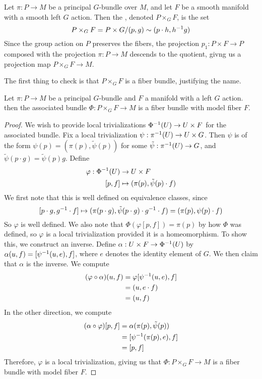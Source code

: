 %
\begin{defn}
Let $\pi : P \to M$ be a principal $G$-bundle over $M$, and let $F$ be a
smooth manifold with a smooth left $G$ action. Then the , denoted $P \times_G F$, is the set
\[
P \times_G F = P \times G / (p,g) \sim (p\cdot h, h^{-1} g)
\]
Since the group action on $P$ preserves the fibers, the projection
$p_1 : P \times F \to P$ composed with the projection $\pi : P \to M$
descends to the quotient, givng us a projection map
$P \times_G F \to M$.
\end{defn}
%
The first thing to check is that $P \times_G F$ is a fiber bundle, justifying
the name.
%
\begin{prop}
Let $\pi : P \to M$ be a principal $G$-bundle and $F$ a manifold with a left $G$ action.
then the associated bundle $ \Phi : P \times_G F \to M$ is a fiber bundle with
model fiber $F$.
\end{prop}
%
\begin{proof}
We wish to provide local trivializations  $\Phi^{-1}(U) \to U \times F$ for the
associated bundle. Fix a local trivialization  $\psi : \pi^{-1}(U) \to U \times G$.
Then $\psi$ is of the form $\psi(p) = (\pi(p), \tilde{\psi}(p))$
for some $\tilde{\psi} : \pi^{-1}(U) \to G$, and
$\tilde{\psi}(p\cdot g) = \tilde{\psi}(p)g$.
Define
\begin{align*}
\varphi : \Phi^{-1}(U) &\to U \times F \\
[p,f] &\mapsto (\pi(p), \tilde{\psi}(p)\cdot f)
\end{align*}
We first note that this is well defined on equivalence classes, since
\[
[p\cdot g, g^{-1} \cdot f] \mapsto (\pi(p \cdot g), \tilde{\psi}(p \cdot g)
\cdot g^{-1} \cdot f)
= (\pi(p), \psi(p)\cdot f)
\]
So $\varphi$ is well defined. We also note that $\Phi(\varphi[p,f]) = \pi(p)$
by how $\Phi$ was defined, so $\varphi$ is a local trivialization provided
it is a homeomorphism. To show this, we construct an inverse.
Define $\alpha : U \times F \to \Phi^{-1}(U)$
by $\alpha(u,f) = [\psi^{-1}(u,e), f]$, where $e$ denotes the identity element
of $G$. We then claim that $\alpha$ is the inverse. We compute
%
\begin{align*}
(\varphi \circ \alpha)(u,f) &= \varphi[\psi^{-1}(u,e),f] \\
&= (u, e\cdot f)\\
&= (u,f)
\end{align*}
%
In the other direction, we compute
%
\begin{align*}
(\alpha \circ \varphi)[p,f] &= \alpha(\pi(p), \tilde{\psi}(p)) \\
&= [\psi^{-1}(\pi(p), e), f] \\
&= [p, f]
\end{align*}
%
Therefore, $\varphi$ is a local trivialization, giving us that
$\Phi: P \times_G F \to M$ is a fiber bundle with model fiber $F$.
%
\end{proof}
